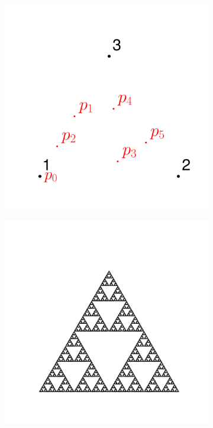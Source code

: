 \documentclass[letterpaper,12pt,oneside]{book}
\begin{document}
\begin{figure}[h]
\centering
\begin{subfigure}{.3\textwidth}
  \centering
  \includegraphics[width=1\linewidth]{Ilustraciones/Cap_SFI/Sierpinski_Iteraciones.png}
  \caption{}
  \label{fig:Sier_sub1}
\end{subfigure}%
\begin{subfigure}{.3\textwidth}
  \centering
  \includegraphics[width=1\linewidth]{Ilustraciones/Cap_SFI/Sierpinski_Final.png}

\end{subfigure}
\end{figure}
\end{document}
